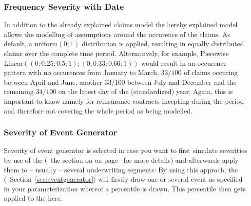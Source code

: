 \subsubsection*{Frequency Severity with Date}

In addition to the already explained claims model  the hereby explained model allows the modelling of assumptions around the occurence of the claims. As default, a uniform$(0;1)$ distribution is applied, resulting in equally distributed claims over the complete time period. Alternatively, for example, Piecewise Linear$((0;0.25;0.5;1);(0;0.33;0.66;1))$ would result in an occurence pattern with no occurences from January to March, $33/100$ of claims occuring between April and June, another $33/100$ between July and December and the remaining $34/100$ on the latest day of the (standardized) year. Again, this is important to know namely for reinsurance contracts incepting during the period and therefore not covering the whole period as being modelled.

\subsubsection*{Severity of Event Generator}
\label{sec:ExternalSeverity}

Severity of event generator is selected in case you want to first simulate severities by use of the  (\cf~the section on  on page~\pageref{sec:eventgenerator} for more details) and afterwards apply them to -- usually -- several underwriting segments: By using this approch, the  (\cf~Section~\ref{sec:eventgenerator}) will firstly draw one or several event as specified in your parameterization whereof a percentile is drawn. This percentile then gets applied to the  here.


